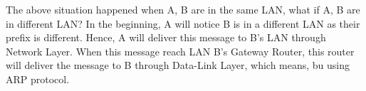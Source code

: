 \documentclass[10pt,a4paper]{article}
\begin{document}
The above situation happened when A, B are in the same LAN, what if A, B are in different LAN? In the beginning, A will notice B is in a different LAN as their prefix is different. Hence, A will deliver this message to B's LAN through Network Layer. When this message reach LAN B's Gateway Router, this router will deliver the message to B through Data-Link Layer, which means, bu using ARP protocol.

\end{document}
